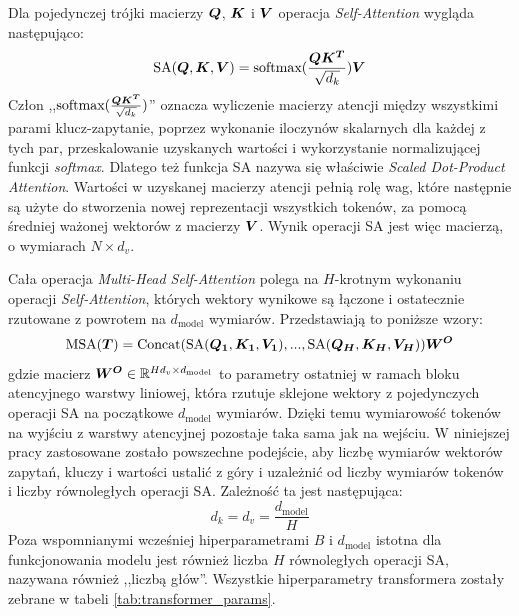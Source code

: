 Dla pojedynczej trójki macierzy $\boldsymbol{Q}$, $\boldsymbol{K}$ i $\boldsymbol{V}$ operacja \emph{Self-Attention} wygląda następująco:
\begin{equation} \label{eq:sa}
    \textrm{SA}(\boldsymbol{Q}, \boldsymbol{K}, \boldsymbol{V}) = \textrm{softmax}(\frac{\boldsymbol{Q}\boldsymbol{K^T}}{\sqrt{d_k}})\boldsymbol{V}
\end{equation}
Człon ,,$\textrm{softmax}(\frac{\boldsymbol{Q}\boldsymbol{K^T}}{\sqrt{d_k}})$'' oznacza wyliczenie macierzy atencji między wszystkimi parami klucz-zapytanie, poprzez wykonanie iloczynów skalarnych dla każdej z tych par, przeskalowanie uzyskanych wartości i wykorzystanie normalizującej funkcji \emph{softmax}. Dlatego też funkcja SA nazywa się właściwie \emph{Scaled Dot-Product Attention}.  Wartości w uzyskanej macierzy atencji pełnią rolę wag, które następnie są użyte do stworzenia nowej reprezentacji wszystkich tokenów, za pomocą średniej ważonej wektorów z macierzy $\boldsymbol{V}$.  Wynik operacji SA jest więc macierzą, o wymiarach $N \times d_v$.

Cała operacja \emph{Multi-Head Self-Attention} polega na $H$-krotnym wykonaniu operacji \emph{Self-Attention}, których wektory wynikowe są łączone i ostatecznie rzutowane z powrotem na $d_{\mathrm{model}}$ wymiarów. Przedstawiają to poniższe wzory:
\begin{equation}
    \textrm{MSA}(\boldsymbol{T}) = \textrm{Concat}(\textrm{SA}(\boldsymbol{Q_1}, \boldsymbol{K_1}, \boldsymbol{V_1}), ..., \textrm{SA}(\boldsymbol{Q_H},
    \boldsymbol{K_H}, \boldsymbol{V_H}))\boldsymbol{W^O}
\end{equation}
gdzie macierz $\boldsymbol{W^O} \in \mathbb{R}^{Hd_v \times d_{\mathrm{model}}}$ to parametry ostatniej w ramach bloku atencyjnego warstwy liniowej, która rzutuje sklejone wektory z pojedynczych operacji SA na początkowe $d_{\mathrm{model}}$ wymiarów. Dzięki temu wymiarowość tokenów na wyjściu z warstwy atencyjnej pozostaje taka sama jak na wejściu. W niniejszej pracy zastosowane zostało powszechne podejście, aby liczbę wymiarów wektorów zapytań, kluczy i wartości ustalić z góry i uzależnić od liczby wymiarów tokenów i liczby równoległych operacji SA. Zależność ta jest następująca:
\begin{equation}
    d_k = d_v = \frac{d_{\mathrm{model}}}{H}
\end{equation}
Poza wspomnianymi wcześniej hiperparametrami $B$ i $d_{\mathrm{model}}$ istotna dla funkcjonowania modelu jest również liczba $H$ równoległych operacji SA, nazywana również ,,liczbą głów''. Wszystkie hiperparametry transformera zostały zebrane w tabeli \ref{tab:transformer_params}.

